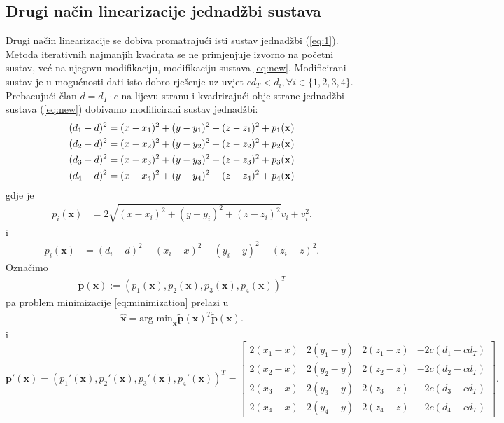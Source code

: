 \documentclass[a4paper,twoside,12pt]{memoir} %
\begin{document}
\subsection{Drugi način linearizacije jednadžbi sustava}
Drugi način linearizacije se dobiva promatrajući isti sustav jednadžbi (\ref{eq:1}).
Metoda iterativnih najmanjih kvadrata se ne primjenjuje izvorno na početni sustav, već na njegovu modifikaciju, modifikaciju sustava \ref{eq:new}.
Modificirani sustav je u mogućnosti dati isto dobro rješenje uz uvjet $cd_T < d_i, \forall i \in \{1,2,3,4\}$. \\

Prebacujući član $d=d_T \cdot c$ na lijevu stranu i kvadrirajući obje strane
jednadžbi sustava (\ref{eq:new}) dobivamo modificirani sustav jednadžbi:
\begin{align}\label{eq:newIzvedba}
(d_1-d)^2 = (x-x_1)^{2}+(y-y_1)^{2}+(z-z_1)^{2} + p_1(\textbf{x})\notag \\
(d_2-d)^2 = (x-x_2)^{2}+(y-y_2)^{2}+(z-z_2)^{2} + p_2(\textbf{x})\\
(d_3-d)^2 = (x-x_3)^{2}+(y-y_3)^{2}+(z-z_3)^{2} + p_3(\textbf{x})\notag \\
(d_4-d)^2 = (x-x_4)^{2}+(y-y_4)^{2}+(z-z_4)^{2} + p_4(\textbf{x})\notag
\end{align}
gdje je 
\begin{align}
p_i(\textbf{x}) & = 2\sqrt{(x-x_i)^{2}+(y-y_i)^{2}+(z-z_i)^{2}}v_i + v_i^2.
\end{align} i
\begin{align}
p_i(\textbf{x}) & = (d_i-d)^2 - (x_i-x)^{2} - (y_i-y)^{2} - (z_i-z)^{2}.
\end{align}
Označimo 
\begin{align} \mathbf{\tilde{p}}(\mathbf{x}) := (p_1(\textbf{x}),p_2(\textbf{x}),p_3(\textbf{x}),p_4(\textbf{x}))^T
\end{align}
pa problem minimizacije \ref{eq:minimization} prelazi u
\begin{align}\label{eq:minimisation3}
\hat{\mathbf{x}} = \text{arg min}_\mathbf{x} \mathbf{\tilde{p}}(\mathbf{x})^T\mathbf{\tilde{p}}(\mathbf{x}).
\end{align}
i $$ \mathbf{\tilde{p}'}(\mathbf{x}) = (p_1'(\textbf{x}),p_2'(\textbf{x}),p_3'(\textbf{x}),p_4'(\textbf{x}))^T 
= \begin{bmatrix}
2(x_1-x) &  2(y_1-y) &  2(z_1-z) & - 2c(d_1-cd_T)\\
2(x_2-x) &  2(y_2-y) &  2(z_2-z) & - 2c(d_2-cd_T) \\
2(x_3-x) &  2(y_3-y) &  2(z_3-z) & - 2c(d_3-cd_T) \\
2(x_4-x) &  2(y_4-y) &  2(z_4-z) & - 2c(d_4-cd_T) 
\end{bmatrix}
.$$
\end{document}
